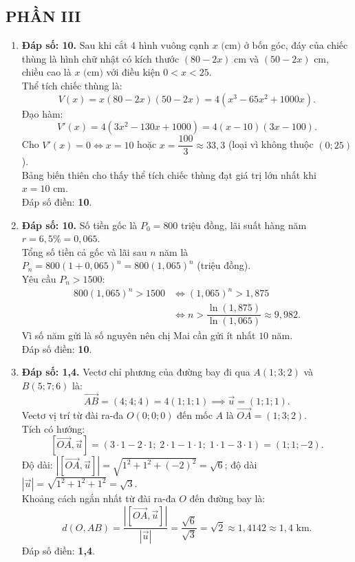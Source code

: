 \documentclass[12pt,a4paper]{article}
\begin{document}
\subsection*{PHẦN III}
\begin{enumerate}[label=\textbf{Câu \arabic*:}, leftmargin=*]
\item \textbf{Đáp số: 10.}
Sau khi cắt 4 hình vuông cạnh $x\text{ (cm)}$ ở bốn góc, đáy của chiếc thùng là hình chữ nhật có kích thước $(80 - 2x)\text{ cm}$ và $(50 - 2x)\text{ cm}$, chiều cao là $x\text{ (cm)}$ với điều kiện $0 < x < 25$.\\
Thể tích chiếc thùng là:
$$V(x) = x(80 - 2x)(50 - 2x) = 4(x^3 - 65x^2 + 1000x).$$
Đạo hàm:
$$V'(x) = 4(3x^2 - 130x + 1000) = 4(x - 10)(3x - 100).$$
Cho $V'(x) = 0 \iff x = 10$ hoặc $x = \dfrac{100}{3} \approx 33{,}3$ (loại vì không thuộc $(0; 25)$).\\
Bảng biến thiên cho thấy thể tích chiếc thùng đạt giá trị lớn nhất khi $x = 10\text{ cm}$.\\
Đáp số điền: \textbf{10}.

\item \textbf{Đáp số: 10.}
Số tiền gốc là $P_0 = 800$ triệu đồng, lãi suất hàng năm $r = 6{,}5\% = 0{,}065$.\\
Tổng số tiền cả gốc và lãi sau $n$ năm là $P_n = 800(1 + 0{,}065)^n = 800(1{,}065)^n$ (triệu đồng).\\
Yêu cầu $P_n > 1500$:
\begin{align*}
800(1{,}065)^n > 1500 &\iff (1{,}065)^n > 1{,}875 \\
&\iff n > \dfrac{\ln(1{,}875)}{\ln(1{,}065)} \approx 9{,}982.
\end{align*}
Vì số năm gửi là số nguyên nên chị Mai cần gửi ít nhất $10$ năm.\\
Đáp số điền: \textbf{10}.

\item \textbf{Đáp số: 1,4.}
Vectơ chỉ phương của đường bay đi qua $A(1; 3; 2)$ và $B(5; 7; 6)$ là:
$$\overrightarrow{AB} = (4; 4; 4) = 4(1; 1; 1) \implies \vec{u} = (1; 1; 1).$$
Vectơ vị trí từ đài ra-đa $O(0; 0; 0)$ đến mốc $A$ là $\overrightarrow{OA} = (1; 3; 2)$.\\
Tích có hướng:
$$\left[ \overrightarrow{OA}, \vec{u} \right] = (3 \cdot 1 - 2 \cdot 1;\; 2 \cdot 1 - 1 \cdot 1;\; 1 \cdot 1 - 3 \cdot 1) = (1; 1; -2).$$
Độ dài: $\left| \left[ \overrightarrow{OA}, \vec{u} \right] \right| = \sqrt{1^2 + 1^2 + (-2)^2} = \sqrt{6}$; độ dài $|\vec{u}| = \sqrt{1^2 + 1^2 + 1^2} = \sqrt{3}$.\\
Khoảng cách ngắn nhất từ đài ra-đa $O$ đến đường bay là:
$$d(O, AB) = \dfrac{\left| \left[ \overrightarrow{OA}, \vec{u} \right] \right|}{|\vec{u}|} = \dfrac{\sqrt{6}}{\sqrt{3}} = \sqrt{2} \approx 1{,}4142 \approx 1{,}4\text{ km}.$$
Đáp số điền: \textbf{1,4}.


\end{enumerate}
\end{document}
